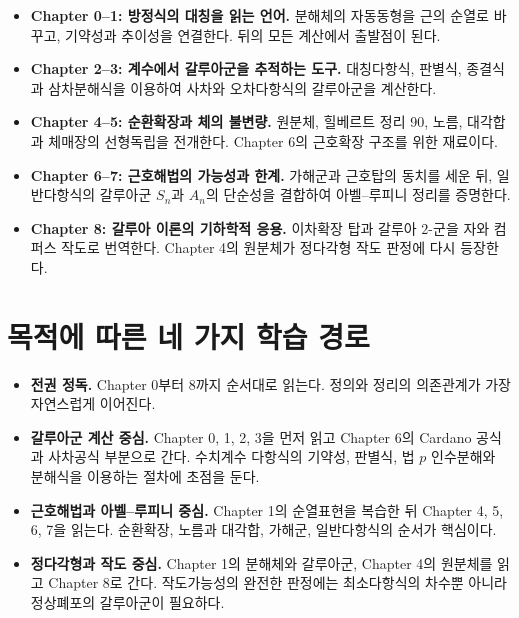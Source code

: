 \begin{itemize}
  \item \textbf{Chapter 0--1: 방정식의 대칭을 읽는 언어.}
  분해체의 자동동형을 근의 순열로 바꾸고, 기약성과 추이성을 연결한다. 뒤의 모든 계산에서 출발점이 된다.

  \item \textbf{Chapter 2--3: 계수에서 갈루아군을 추적하는 도구.}
  대칭다항식, 판별식, 종결식과 삼차분해식을 이용하여 사차와 오차다항식의 갈루아군을 계산한다.

  \item \textbf{Chapter 4--5: 순환확장과 체의 불변량.}
  원분체, 힐베르트 정리 90, 노름, 대각합과 체매장의 선형독립을 전개한다. Chapter 6의 근호확장 구조를 위한 재료이다.

  \item \textbf{Chapter 6--7: 근호해법의 가능성과 한계.}
  가해군과 근호탑의 동치를 세운 뒤, 일반다항식의 갈루아군 $S_n$과 $A_n$의 단순성을 결합하여 아벨--루피니 정리를 증명한다.

  \item \textbf{Chapter 8: 갈루아 이론의 기하학적 응용.}
  이차확장 탑과 갈루아 $2$-군을 자와 컴퍼스 작도로 번역한다. Chapter 4의 원분체가 정다각형 작도 판정에 다시 등장한다.
\end{itemize}

\section*{목적에 따른 네 가지 학습 경로}

\begin{itemize}
  \item \textbf{전권 정독.}
  Chapter 0부터 8까지 순서대로 읽는다. 정의와 정리의 의존관계가 가장 자연스럽게 이어진다.

  \item \textbf{갈루아군 계산 중심.}
  Chapter 0, 1, 2, 3을 먼저 읽고 Chapter 6의 Cardano 공식과 사차공식 부분으로 간다. 수치계수 다항식의 기약성, 판별식, 법 $p$ 인수분해와 분해식을 이용하는 절차에 초점을 둔다.

  \item \textbf{근호해법과 아벨--루피니 중심.}
  Chapter 1의 순열표현을 복습한 뒤 Chapter 4, 5, 6, 7을 읽는다. 순환확장, 노름과 대각합, 가해군, 일반다항식의 순서가 핵심이다.

  \item \textbf{정다각형과 작도 중심.}
  Chapter 1의 분해체와 갈루아군, Chapter 4의 원분체를 읽고 Chapter 8로 간다. 작도가능성의 완전한 판정에는 최소다항식의 차수뿐 아니라 정상폐포의 갈루아군이 필요하다.
\end{itemize}

